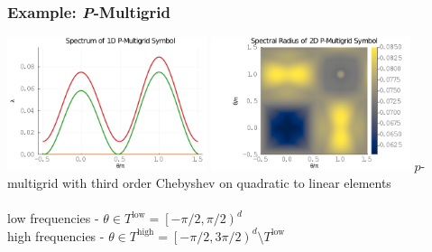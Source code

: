 \documentclass{beamer}
\begin{document}

\begin{frame}
\begin{center}
\frametitle{Example: {\textit P}-Multigrid}

\includegraphics[height=3.9cm]{../img/pmultigridSymbol1D}
\includegraphics[height=3.9cm]{../img/pmultigridSymbol2D}
{\small $p$-multigrid with third order Chebyshev on quadratic to linear elements}\\

~\\

low frequencies - $\theta \in T^{\text{low}} = \left[ - \pi / 2, \pi / 2 \right)^d$\\

high frequencies - $\theta \in T^{\text{high}} = \left[ - \pi / 2, 3 \pi / 2 \right)^d \setminus T^{\text{low}}$

\end{center}
\end{frame}

\end{document}
